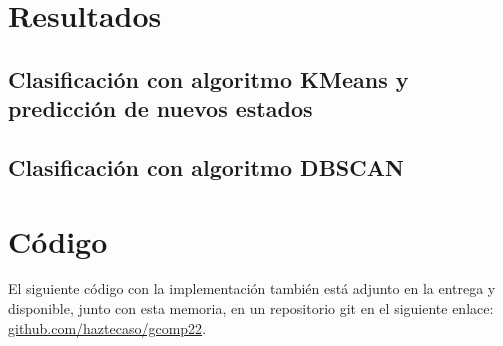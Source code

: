 \documentclass[10pt, spanish]{article}
\theoremstyle{definition}
\theoremstyle{break}
\begin{document}
\section{Resultados}
\subsection{Clasificación con algoritmo KMeans y predicción de nuevos estados}

\begin{center}
    \makebox[\textwidth][c]{\scalebox{0.65}{}}
\end{center}
\subsection{Clasificación con algoritmo DBSCAN}
\begin{center}
    \makebox[\textwidth][c]{\scalebox{0.65}{}}
\end{center}
\begin{center}
    \makebox[\textwidth][c]{\scalebox{0.65}{}}
\end{center}

\section{Código}

El siguiente código con la implementación también está adjunto en la entrega
y disponible, junto con esta memoria, en un repositorio git en el siguiente
enlace:
\href{https://www.github.com/haztecaso/gcomp22}{github.com/haztecaso/gcomp22}.
\vspace{1em}


\end{document}
